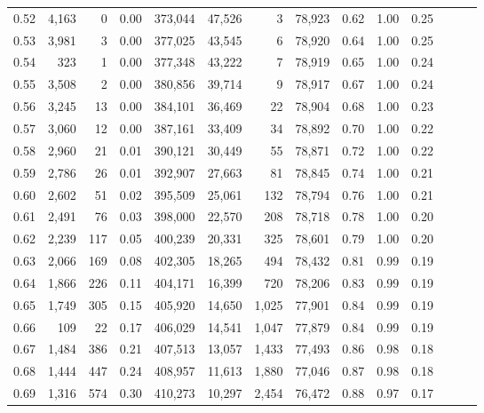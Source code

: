 \begin{tabular}{rrrrrrrrrrrrrr}
0.52 &   4,163 &      0 &  0.00 &  373,044 &   47,526 &       3 &  78,923 &  0.62 &  1.00 &      0.25 \\
0.53 &   3,981 &      3 &  0.00 &  377,025 &   43,545 &       6 &  78,920 &  0.64 &  1.00 &      0.25 \\
0.54 &     323 &      1 &  0.00 &  377,348 &   43,222 &       7 &  78,919 &  0.65 &  1.00 &      0.24 \\
0.55 &   3,508 &      2 &  0.00 &  380,856 &   39,714 &       9 &  78,917 &  0.67 &  1.00 &      0.24 \\
0.56 &   3,245 &     13 &  0.00 &  384,101 &   36,469 &      22 &  78,904 &  0.68 &  1.00 &      0.23 \\
0.57 &   3,060 &     12 &  0.00 &  387,161 &   33,409 &      34 &  78,892 &  0.70 &  1.00 &      0.22 \\
0.58 &   2,960 &     21 &  0.01 &  390,121 &   30,449 &      55 &  78,871 &  0.72 &  1.00 &      0.22 \\
0.59 &   2,786 &     26 &  0.01 &  392,907 &   27,663 &      81 &  78,845 &  0.74 &  1.00 &      0.21 \\
0.60 &   2,602 &     51 &  0.02 &  395,509 &   25,061 &     132 &  78,794 &  0.76 &  1.00 &      0.21 \\
0.61 &   2,491 &     76 &  0.03 &  398,000 &   22,570 &     208 &  78,718 &  0.78 &  1.00 &      0.20 \\
0.62 &   2,239 &    117 &  0.05 &  400,239 &   20,331 &     325 &  78,601 &  0.79 &  1.00 &      0.20 \\
0.63 &   2,066 &    169 &  0.08 &  402,305 &   18,265 &     494 &  78,432 &  0.81 &  0.99 &      0.19 \\
0.64 &   1,866 &    226 &  0.11 &  404,171 &   16,399 &     720 &  78,206 &  0.83 &  0.99 &      0.19 \\
0.65 &   1,749 &    305 &  0.15 &  405,920 &   14,650 &   1,025 &  77,901 &  0.84 &  0.99 &      0.19 \\
0.66 &     109 &     22 &  0.17 &  406,029 &   14,541 &   1,047 &  77,879 &  0.84 &  0.99 &      0.19 \\
0.67 &   1,484 &    386 &  0.21 &  407,513 &   13,057 &   1,433 &  77,493 &  0.86 &  0.98 &      0.18 \\
0.68 &   1,444 &    447 &  0.24 &  408,957 &   11,613 &   1,880 &  77,046 &  0.87 &  0.98 &      0.18 \\
0.69 &   1,316 &    574 &  0.30 &  410,273 &   10,297 &   2,454 &  76,472 &  0.88 &  0.97 &      0.17 \\

\end{tabular}
